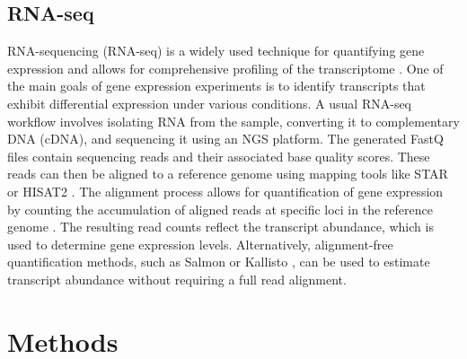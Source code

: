 \documentclass[12pt]{article}
\begin{document}
\subsection{RNA-seq}
RNA-sequencing (RNA-seq) is a widely used technique for quantifying gene expression and allows for comprehensive profiling of the transcriptome \cite{Kukurba2015}.
One of the main goals of gene expression experiments is to identify transcripts that exhibit differential expression under various conditions.
A usual RNA-seq workflow involves isolating RNA from the sample, converting it to complementary DNA (cDNA), and sequencing it using an NGS platform.
The generated FastQ files contain sequencing reads and their associated base quality scores. These reads can then be aligned to a reference genome using mapping tools like STAR \cite{Dobin2012} or HISAT2 \cite{Kim2019}.
The alignment process allows for quantification of gene expression by counting the accumulation of aligned reads at specific loci in the reference genome \cite{Kukurba2015}. The resulting read counts reflect the transcript abundance, which is used to determine gene expression levels\cite{Kukurba2015}.
Alternatively, alignment-free quantification methods, such as Salmon \cite{Patro2017} or Kallisto \cite{Bray2016}, can be used to estimate transcript abundance without requiring a full read alignment.

\section{Methods}
\end{document}

